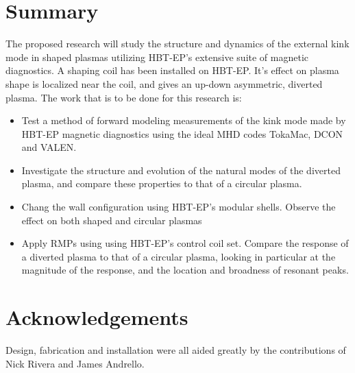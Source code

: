 \documentclass[aps,prl,twocolumn,superscriptaddress,groupedaddress]{revtex4}  %
\begin{document}
\newpage
\section{Summary}
The proposed research will study the structure and dynamics of the external kink mode in shaped plasmas utilizing HBT-EP's extensive suite of magnetic diagnostics.  A shaping coil has been installed on HBT-EP.  It's effect on plasma shape is localized near the coil, and gives an up-down asymmetric, diverted plasma.  The work that is to be done for this research is:
\begin{itemize}
\item Test a method of forward modeling measurements of the kink mode made by HBT-EP magnetic diagnostics using the ideal MHD codes TokaMac, DCON and VALEN.
\item Investigate the structure and evolution of the natural modes of the diverted plasma, and compare these properties to that of a circular plasma.
\item Chang the wall configuration using HBT-EP's modular shells.  Observe the effect on both shaped and circular plasmas
\item Apply RMPs using using HBT-EP's control coil set.  Compare the response of a diverted plasma to that of a circular plasma, looking in particular at the magnitude of the response, and the location and broadness of resonant peaks.

\end{itemize}
\section{Acknowledgements}
Design, fabrication and installation were all aided greatly by the contributions of Nick Rivera and James Andrello.
\end{document}
